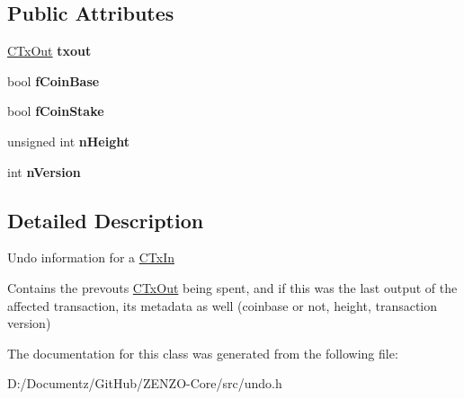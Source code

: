 \subsection*{Public Attributes}
\begin{DoxyCompactItemize}
\item 
\mbox{\label{class_c_tx_in_undo_a0eb1374984b5b68b0af14d88d7d4b821}} 
\mbox{\hyperlink{class_c_tx_out}{C\+Tx\+Out}} {\bfseries txout}
\item 
\mbox{\label{class_c_tx_in_undo_a5952f917224de3a2193157b856c47864}} 
bool {\bfseries f\+Coin\+Base}
\item 
\mbox{\label{class_c_tx_in_undo_a59d196d060b8241e8e95640144de6155}} 
bool {\bfseries f\+Coin\+Stake}
\item 
\mbox{\label{class_c_tx_in_undo_af022118f015a9b1b9ab96e04e8452292}} 
unsigned int {\bfseries n\+Height}
\item 
\mbox{\label{class_c_tx_in_undo_a193281289475ca792e436a7a02de23ef}} 
int {\bfseries n\+Version}
\end{DoxyCompactItemize}


\subsection{Detailed Description}
Undo information for a \mbox{\hyperlink{class_c_tx_in}{C\+Tx\+In}}

Contains the prevout\textquotesingle{}s \mbox{\hyperlink{class_c_tx_out}{C\+Tx\+Out}} being spent, and if this was the last output of the affected transaction, its metadata as well (coinbase or not, height, transaction version) 

The documentation for this class was generated from the following file\+:\begin{DoxyCompactItemize}
\item 
D\+:/\+Documentz/\+Git\+Hub/\+Z\+E\+N\+Z\+O-\/\+Core/src/undo.\+h\end{DoxyCompactItemize}
